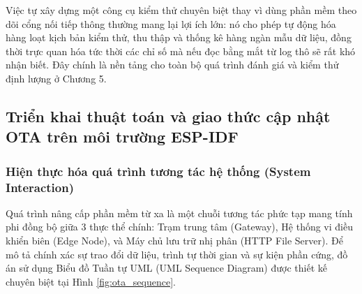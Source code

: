 

Việc tự xây dựng một công cụ kiểm thử chuyên biệt thay vì dùng phần mềm theo dõi cổng nối tiếp thông thường mang lại lợi ích lớn: nó cho phép tự động hóa hàng loạt kịch bản kiểm thử, thu thập và thống kê hàng ngàn mẫu dữ liệu, đồng thời trực quan hóa tức thời các chỉ số mà nếu đọc bằng mắt từ log thô sẽ rất khó nhận biết. Đây chính là nền tảng cho toàn bộ quá trình đánh giá và kiểm thử định lượng ở Chương 5.

\subsection{Triển khai thuật toán và giao thức cập nhật OTA trên môi trường ESP-IDF}

\subsubsection{Hiện thực hóa quá trình tương tác hệ thống (System Interaction)}
Quá trình nâng cấp phần mềm từ xa là một chuỗi tương tác phức tạp mang tính phi đồng bộ giữa 3 thực thể chính: Trạm trung tâm (Gateway), Hệ thống vi điều khiển biên (Edge Node), và Máy chủ lưu trữ nhị phân (HTTP File Server). Để mô tả chính xác sự trao đổi dữ liệu, trình tự thời gian và sự kiện phần cứng, đồ án sử dụng Biểu đồ Tuần tự UML (UML Sequence Diagram) được thiết kế chuyên biệt tại Hình \ref{fig:ota_sequence}.

